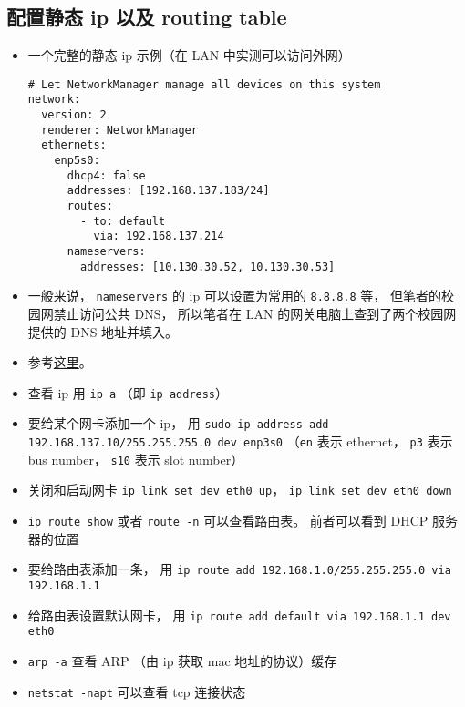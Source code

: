 \subsection{配置静态 ip 以及 routing table}
\begin{itemize}
\item 一个完整的静态 ip 示例（在 LAN 中实测可以访问外网）
\begin{lstlisting}[language=none, caption=01-network-manager-all.yaml]
# Let NetworkManager manage all devices on this system
network:
  version: 2
  renderer: NetworkManager
  ethernets:
    enp5s0:
      dhcp4: false
      addresses: [192.168.137.183/24]
      routes:
        - to: default
          via: 192.168.137.214
      nameservers:
        addresses: [10.130.30.52, 10.130.30.53]
\end{lstlisting}
\item 一般来说， \verb|nameservers| 的 ip 可以设置为常用的 \verb|8.8.8.8| 等， 但笔者的校园网禁止访问公共 DNS， 所以笔者在 LAN 的网关电脑上查到了两个校园网提供的 DNS 地址并填入。
\item 参考\href{https://linuxiac.com/how-to-set-static-ip-address-and-modifying-routing-table-on-linux/}{这里}。
\item 查看 ip 用 \verb|ip a| （即 \verb|ip address|）
\item 要给某个网卡添加一个 ip， 用 \verb|sudo ip address add 192.168.137.10/255.255.255.0 dev enp3s0| （\verb|en| 表示 ethernet， \verb|p3| 表示 bus number， \verb|s10| 表示 slot number）
\item 关闭和启动网卡 \verb|ip link set dev eth0 up|， \verb|ip link set dev eth0 down|
\item \verb|ip route show| 或者 \verb|route -n| 可以查看路由表。 前者可以看到 DHCP 服务器的位置
\item 要给路由表添加一条， 用 \verb|ip route add 192.168.1.0/255.255.255.0 via 192.168.1.1|
\item 给路由表设置默认网卡， 用 \verb|ip route add default via 192.168.1.1 dev eth0|
\item \verb|arp -a| 查看 ARP （由 ip 获取 mac 地址的协议）缓存
\item \verb|netstat -napt| 可以查看 tcp 连接状态
\end{itemize}


